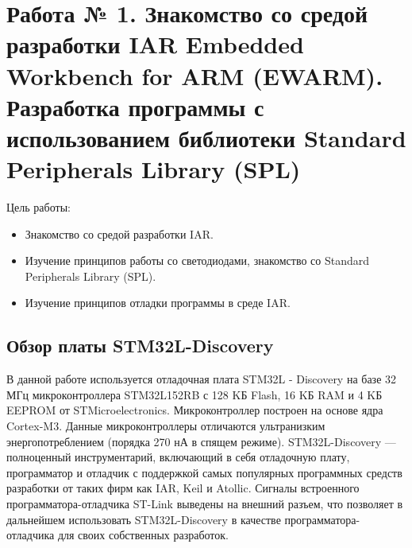 \chapter{Работа № 1. Знакомство со средой разработки IAR Embedded Workbench for ARM (EWARM). Разработка программы с использованием библиотеки Standard Peripherals Library (SPL)}
Цель работы: 
\begin{itemize}
\item Знакомство со средой разработки IAR.
\item Изучение принципов работы со светодиодами, знакомство со Standard Peripherals Library (SPL).
\item Изучение принципов отладки программы в среде IAR.
\end{itemize}
\section{Обзор платы STM32L-Discovery}
В данной работе используется отладочная плата STM32L - Discovery на базе 32 МГц микроконтроллера STM32L152RB с 128 KБ Flash, 16 KБ RAM и 4 KБ EEPROM от STMicroelectronics.  Микроконтроллер построен на основе ядра Cortex-M3. Данные микроконтроллеры отличаются ультранизким энергопотреблением (порядка 270 нА в спящем режиме). STM32L-Discovery --- полноценный инструментарий, включающий в себя отладочную плату, программатор и отладчик с поддержкой самых популярных программных средств разработки от таких фирм как IAR, Keil и Atollic. Сигналы встроенного программатора-отладчика ST-Link выведены на внешний разъем, что позволяет в дальнейшем использовать STM32L-Discovery в качестве программатора-отладчика для своих собственных разработок.


